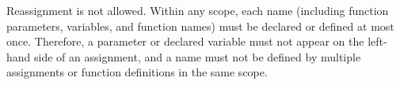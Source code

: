 Reassignment is not allowed. Within any scope, each name (including
function parameters, variables, and function names) must be declared or
defined at most once. Therefore, a parameter or declared variable
must not appear on the left-hand side of an assignment,
and a name must not be defined by multiple
assignments or function definitions in the same scope.

